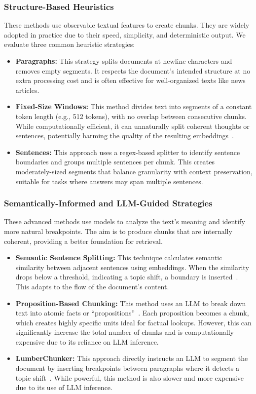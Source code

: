 \subsubsection{Structure-Based Heuristics}
These methods use observable textual features to create chunks. They are widely adopted in practice due to their speed, simplicity, and deterministic output. We evaluate three common heuristic strategies:
\begin{itemize}
	\item \textbf{Paragraphs:} This strategy splits documents at newline characters and removes empty segments. It respects the document's intended structure at no extra processing cost and is often effective for well-organized texts like news articles.
	\item \textbf{Fixed-Size Windows:} This method divides text into segments of a constant token length (e.g., 512 tokens), with no overlap between consecutive chunks. While computationally efficient, it can unnaturally split coherent thoughts or sentences, potentially harming the quality of the resulting embeddings~\cite{multi_hop_retrieval}.
	\item \textbf{Sentences:} This approach uses a regex-based splitter to identify sentence boundaries and groups multiple sentences per chunk. This creates moderately-sized segments that balance granularity with context preservation, suitable for tasks where answers may span multiple sentences.
\end{itemize}

\subsubsection{Semantically-Informed and LLM-Guided Strategies}
These advanced methods use models to analyze the text's meaning and identify more natural breakpoints. The aim is to produce chunks that are internally coherent, providing a better foundation for retrieval.
\begin{itemize}
	\item \textbf{Semantic Sentence Splitting:} This technique calculates semantic similarity between adjacent sentences using embeddings. When the similarity drops below a threshold, indicating a topic shift, a boundary is inserted~\cite{greg_5_levels_of_text_splitting_nodate}. This adapts to the flow of the document's content.
	\item \textbf{Proposition-Based Chunking:} This method uses an LLM to break down text into atomic facts or ``propositions''~\cite{chen_dense_2024}. Each proposition becomes a chunk, which creates highly specific units ideal for factual lookups. However, this can significantly increase the total number of chunks and is computationally expensive due to its reliance on LLM inference.
	\item \textbf{LumberChunker:} This approach directly instructs an LLM to segment the document by inserting breakpoints between paragraphs where it detects a topic shift~\cite{duarte_lumberchunker_2024}. While powerful, this method is also slower and more expensive due to its use of LLM inference.
\end{itemize}

